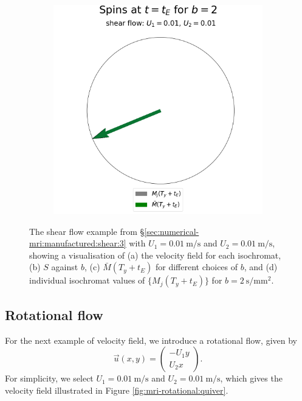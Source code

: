\begin{figure}
\begin{subfigure}{0.4\textwidth}
                        \caption{}
                        \label{fig:mri-shear-3:b}
                    \end{subfigure}
                    \begin{subfigure}{0.4\textwidth}
                        \centering
                        \includegraphics[width=\textwidth]{diagrams/results-mri/simple-tests/mri-spins_avg_2D_shear_test_3.png}
                        \caption{}
                        \label{fig:mri-shear-3:spins}
                    \end{subfigure}
                    \caption{The shear flow example from \S\ref{sec:numerical-mri:manufactured:shear:3} with $U_1 = \qty{0.01}{\metre\per\second}$ and $U_2 = \qty{0.01}{\metre\per\second}$, showing a visualisation of (a) the velocity field for each isochromat, (b) $S$ against $b$, (c) $\bar{M}(T_y + t_E)$ for different choices of $b$, and (d) individual isochromat values of $\{ M_j(T_y + t_E) \}$ for $b=\qty{2}{\second\per\milli\metre^2}$.}
                    \label{fig:mri-shear-3}
                \end{figure}

        \subsection{Rotational flow} \label{sec:numerical-mri:manufactured:rotational}
            For the next example of velocity field, we introduce a rotational flow, given by
            \begin{equation}
                \vec{u}(x, y) = \begin{pmatrix}-U_1 y \\ U_2 x\end{pmatrix}.
            \end{equation}
            For simplicity, we select $U_1 = \qty{0.01}{\metre\per\second}$ and $U_2 = \qty{0.01}{\metre\per\second}$, which gives the velocity field illustrated in Figure \ref{fig:mri-rotational:quiver}.
            
